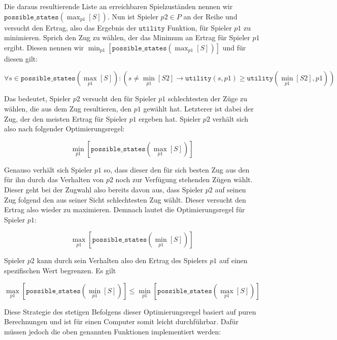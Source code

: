 Die daraus resultierende Liste an erreichbaren Spielzuständen nennen wir $\mathtt{possible\_states}(\max_{p1}[S])$. Nun ist Spieler $p2 \in P$ an der Reihe und versucht den Ertrag, also das Ergebnis der $\mathtt{utility}$ Funktion, für Spieler $p1$ zu minimieren. Sprich den Zug zu wählen, der das Minimum an Ertrag für Spieler $p1$ ergibt. Diesen nennen wir $\min_{p1}[\mathtt{possible\_states}(\max_{p1}[S])]$ und für diesen gilt:

\begin{equation}
\forall s \in \mathtt{possible\_states}(\max_{p1}[S]) : (s \neq \min_{p1}[S2] \rightarrow \mathtt{utility}(s, p1) \geq \mathtt{utility}(\min_{p1}[S2], p1))
\end{equation}

Das bedeutet, Spieler $p2$ versucht den für Spieler $p1$ schlechtesten der Züge zu wählen, die aus dem Zug resultieren, den $p1$ gewählt hat. Letzterer ist dabei der Zug, der den meisten Ertrag für Spieler $p1$ ergeben hat. Spieler $p2$ verhält sich also nach folgender Optimierungsregel:

\begin{equation}
\min_{p1}[\mathtt{possible\_states}(\max_{p1}[S])]
\end{equation}

Genauso verhält sich Spieler $p1$ so, dass dieser den für sich besten Zug aus den für ihn durch das Verhalten von $p2$ noch zur Verfügung stehenden Zügen wählt. Dieser geht bei der Zugwahl also bereits davon aus, dass Spieler $p2$ auf seinen Zug folgend den aus seiner Sicht schlechtesten Zug wählt. Dieser versucht den Ertrag also wieder zu maximieren. Demnach lautet die Optimierungsregel für Spieler $p1$:

\begin{equation}
\max_{p1}[\mathtt{possible\_states}(\min_{p1}[S])]
\end{equation}

Spieler $p2$ kann durch sein Verhalten also den Ertrag des Spielers $p1$ auf einen spezifischen Wert begrenzen. Es gilt

\begin{equation}
\max_{p1}[\mathtt{possible\_states}(\min_{p1}[S])] \leq \min_{p1}[\mathtt{possible\_states}(\max_{p1}[S])]
\end{equation}

Diese Strategie des stetigen Befolgens dieser Optimierungsregel basiert auf puren Berechnungen und ist für einen Computer somit leicht durchführbar. Dafür müssen jedoch die oben genannten Funktionen implementiert werden:


